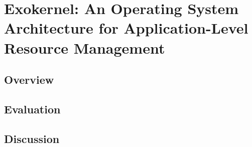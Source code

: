 \section{Exokernel: An Operating System Architecture for Application-Level Resource Management}

\subsection{Overview}

\subsection{Evaluation}
\subsection{Discussion}